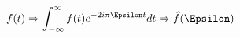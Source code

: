 \documentclass[preview]{standalone}
\begin{document}
\begin{align*}
f(t)\Rightarrow  \int_{-\infty}^{\infty}f(t)e^{-2 i \pi \Epsilon t} dt  \Rightarrow\hat{f}(\Epsilon)
\end{align*}
\end{document}
